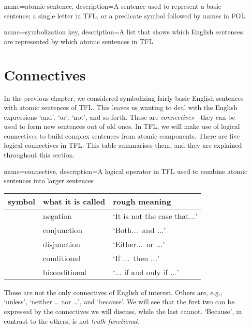 {
name=atomic sentence,
description={A sentence used to represent a basic sentence; a single letter in TFL, or a predicate symbol followed by names in FOL}
}

{
name=symbolization key,
description={A list that shows which English sentences are represented by which \glspl{atomic sentence} in TFL}
}

\chapter{Connectives}
\label{s:TFLConnectives}

In the previous chapter, we considered symbolizing fairly basic English sentences with atomic sentences of TFL. This leaves us wanting to deal with the English expressions `and', `or', `not', and so forth. These are \emph{connectives}---they can be used to form new sentences out of old ones. In TFL, we will make use of logical connectives to build complex sentences from atomic components. There are five logical connectives in TFL. This table summarises them, and they are explained throughout this section.

{
name=connective,
description={A logical operator in TFL used to combine \glspl{atomic sentence} into larger sentences}
}
	\begin{table}[h]
	\center
	\begin{tabular}{l l l}
	
	\textbf{symbol}&\textbf{what it is called}&\textbf{rough meaning}\\
	\hline
	\enot&negation&`It is not the case that$\ldots$'\\
	\eand&conjunction&`Both$\ldots$\ and $\ldots$'\\
	\eor&disjunction&`Either$\ldots$\ or $\ldots$'\\
	\eif&conditional&`If $\ldots$\ then $\ldots$'\\
	\eiff&biconditional&`$\ldots$ if and only if $\ldots$'\\
	
	\end{tabular}
	\end{table}

These are not the only connectives of English of interest. Others are, e.g., `unless', `neither \dots{} nor \dots', and `because'. We will see that the first two can be expressed by the connectives we will discuss, while the last cannot. `Because', in contrast to the others, is not \emph{truth functional}.

